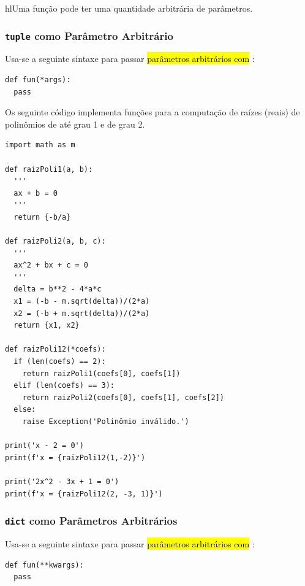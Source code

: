 hl{Uma função pode ter uma quantidade arbitrária de parâmetros}.

\subsubsection{\texttt{tuple} como Parâmetro Arbitrário}

Usa-se a seguinte sintaxe para passar \hl{parâmetros arbitrários com {\PYTHONtuple}}:

\begin{lstlisting}
def fun(*args):
  pass
\end{lstlisting}

\begin{ex}
  Os seguinte código implementa funções para a computação de raízes (reais) de polinômios de até grau 1 e de grau 2.

\begin{lstlisting}
import math as m

def raizPoli1(a, b):
  '''
  ax + b = 0
  '''
  return {-b/a}

def raizPoli2(a, b, c):
  '''
  ax^2 + bx + c = 0
  '''
  delta = b**2 - 4*a*c
  x1 = (-b - m.sqrt(delta))/(2*a)
  x2 = (-b + m.sqrt(delta))/(2*a)
  return {x1, x2}

def raizPoli12(*coefs):
  if (len(coefs) == 2):
    return raizPoli1(coefs[0], coefs[1])
  elif (len(coefs) == 3):
    return raizPoli2(coefs[0], coefs[1], coefs[2])
  else:
    raise Exception('Polinômio inválido.')

print('x - 2 = 0')
print(f'x = {raizPoli12(1,-2)}')

print('2x^2 - 3x + 1 = 0')
print(f'x = {raizPoli12(2, -3, 1)}')
\end{lstlisting}

\end{ex}

\subsubsection{\texttt{dict} como Parâmetros Arbitrários}

Usa-se a seguinte sintaxe para passar \hl{parâmetros arbitrários com {\PYTHONdict}}:

\begin{lstlisting}
def fun(**kwargs):
  pass
\end{lstlisting}


